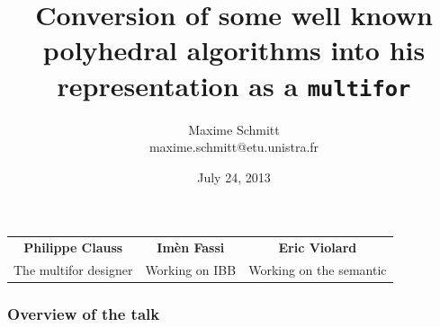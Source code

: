 \documentclass{beamer}
\title[From C loop nest to \texttt{multifor} loop nest]{Conversion of some well known polyhedral algorithms into his representation as a \texttt{multifor}
}
\author[Maxime Schmitt]{Maxime Schmitt \\ \scriptsize{maxime.schmitt@etu.unistra.fr}
}
\date{July 24, 2013}
\institute[ICube]{
    Department of Informatics \\
        ICube laboratories \\
        University of Strasbourg
}
\begin{document}

\begin{frame}
\titlepage{}

\tiny{
\begin{tabular}{|c|c|c|}
\hline
\bf{Philippe Clauss} & \bf{Imèn Fassi} & \bf{Eric Violard} \\
The multifor designer & Working on IBB & Working on the semantic \\
\hline
\end{tabular}
}
\end{frame}


\begin{frame}
\frametitle{Overview of the talk}
\tableofcontents{}
\end{frame}
\end{document}
